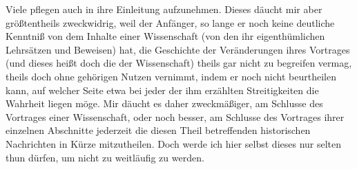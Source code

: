 \begin{RWanm}
Viele pflegen auch  in ihre Einleitung aufzunehmen. Dieses däucht mir aber größtentheils zweckwidrig, weil der Anfänger, so lange er noch keine deutliche Kenntniß von dem Inhalte einer Wissenschaft (von den ihr eigenthümlichen Lehrsätzen und Beweisen) hat, die Geschichte der Veränderungen ihres Vortrages (und dieses heißt doch die  der Wissenschaft) theils gar nicht zu begreifen vermag, theils doch ohne gehörigen Nutzen vernimmt, indem er noch nicht beurtheilen kann, auf welcher Seite etwa bei jeder der ihm erzählten Streitigkeiten die Wahrheit liegen möge. Mir däucht es daher zweckmäßiger, am Schlusse des Vortrages einer Wissenschaft, oder noch besser, am Schlusse des Vortrages ihrer einzelnen Abschnitte jederzeit die diesen Theil betreffenden historischen Nachrichten in Kürze mitzutheilen. Doch werde ich hier selbst dieses nur selten thun dürfen, um nicht zu weitläufig zu werden.
\end{RWanm}

